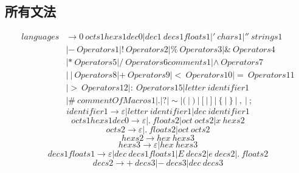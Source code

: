 \documentclass[UTF8]{ctexart}
\begin{document}
\subsection{所有文法}
\begin{equation}
	\begin{aligned}
		languages & \rightarrow 0 \ octs1hexs1dec0 | dec1 \ decs1floats1 | ' \ chars1 | '' \ strings1                                   \\
		          & | - \ Operators1 | ! \ Operators2 | \% \ Operators3  | \& \ Operators4                                              \\
		          & | * \ Operators5  | / \ Operators6comments1 | \wedge \ Operators7                                                   \\
		          & | \ | \ Operators8 | + \ Operators9  | < \ Operators10 | = \ Operators11                                            \\
		          & | > \ Operators12  | \colon \ Operators15 | letter \ identifier1                                                    \\
		          & | \# \ commentOfMacros1  | . | ? | \sim | (  \ | \  )  \ | \  [  \ | \  ]  \ | \  \{  \ | \  \}  \ | \  ,  \ | \  ;
	\end{aligned}
\end{equation}
\begin{equation}
	identifier1 \rightarrow \varepsilon | letter \ identifier1 | dec \ identifier1
\end{equation}
\begin{equation}
	octs1hexs1dec0 \rightarrow \varepsilon | . \ floats2 | oct \ octs2 | x \ hexs2
\end{equation}
\begin{equation}
	octs2 \rightarrow \varepsilon | . \ floats2 | oct \ octs2
\end{equation}
\begin{equation}
	hexs2 \rightarrow hex \ hexs3
\end{equation}
\begin{equation}
	hexs3 \rightarrow \varepsilon | hex \ hexs3
\end{equation}
\begin{equation}
	decs1floats1 \rightarrow \varepsilon | dec \ decs1floats1 | E \ decs2 | e \ decs2 | . \ floats2
\end{equation}
\begin{equation}
	decs2 \rightarrow + \ decs3 | - \ decs3 | dec \ decs3
\end{equation}
\end{document}

